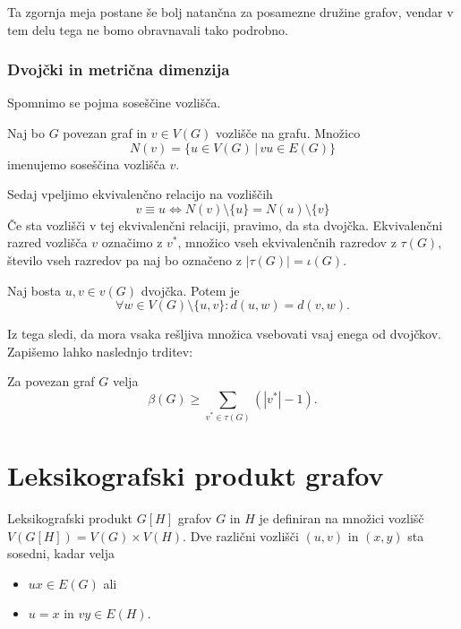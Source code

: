 \documentclass[mat1, tisk]{fmfdelo}
\begin{document}
Ta zgornja meja postane še bolj natančna za posamezne družine grafov, vendar v tem delu
tega ne bomo obravnavali tako podrobno.

\subsubsection{Dvojčki in metrična dimenzija}
Spomnimo se pojma soseščine vozlišča.

\begin{definicija}
    Naj bo $G$ povezan graf in $v \in V(G)$ vozlišče na grafu. Množico 
    $$N(v) = \{u \in V(G) \, | \,vu \in E(G) \}$$ imenujemo soseščina vozlišča $v$.
\end{definicija}

Sedaj vpeljimo ekvivalenčno relacijo na vozliščih
$$v \equiv u \Leftrightarrow N(v)\setminus \{u\} = N(u) \setminus \{v\}$$
Če sta vozlišči v tej ekvivalenčni relaciji, pravimo, da sta dvojčka. 
Ekvivalenčni razred vozlišča $v$ označimo z $v^{*}$, 
množico vseh ekvivalenčnih razredov z $\tau (G)$, število vseh razredov pa naj bo označeno 
z $|\tau(G)| = \iota(G).$

\begin{lema}
    Naj bosta $u, v \in v(G)$ dvojčka. Potem je 
    $$\forall w \in V(G) \setminus \{u, v\} : d(u, w) = d(v, w).$$
\end{lema}

\begin{dokaz}
\end{dokaz}

Iz tega sledi, da mora vsaka rešljiva množica vsebovati vsaj enega od dvojčkov.
Zapišemo lahko naslednjo trditev:

\begin{trditev}
    Za povezan graf $G$ velja
    $$\beta(G) \geq \sum_{v^{*} \in \tau(G)} (|v^{*}| - 1).$$
\end{trditev}

\begin{dokaz}
\end{dokaz}

\section{Leksikografski produkt grafov}



\begin{definicija}
    Leksikografski produkt $G[H]$ grafov $G$ in $H$ je definiran na množici vozlišč $V (G[H]) = V (G)\times V (H)$. Dve različni vozlišči $(u, v)$ in $(x, y)$ sta sosedni, kadar velja
\begin{itemize}
    \item $ux \in E(G)$ ali
    \item $u = x$ in $vy \in E(H).$ 
\end{itemize}
\end{definicija}
\end{document}
